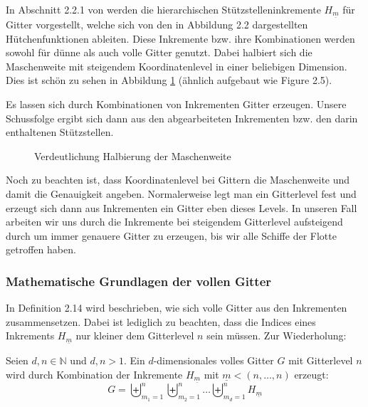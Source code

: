 \documentclass[a4paper,12pt]{llncs}
\numberwithin{equation}{section}
\begin{document}
In Abschnitt 2.2.1 von \cite{M13} werden die hierarchischen Stützstelleninkremente $H_{\underline{m}}$ für Gitter vorgestellt, welche sich von den in \cite{M13} Abbildung 2.2 dargestellten Hütchenfunktionen ableiten. Diese Inkremente bzw. ihre Kombinationen werden sowohl für dünne als auch volle Gitter genutzt. Dabei halbiert sich die Maschenweite mit steigendem Koordinatenlevel in einer beliebigen Dimension. Dies ist schön zu sehen in Abbildung \ref{fig:gitter01} (ähnlich aufgebaut wie \cite{P10} Figure 2.5).

Es lassen sich durch Kombinationen von Inkrementen Gitter erzeugen. Unsere Schussfolge ergibt sich dann aus den abgearbeiteten Inkrementen bzw. den darin enthaltenen Stützstellen. 

\begin{figure}
	\centering
	\resizebox{90mm}{!}{}
	\caption{Verdeutlichung Halbierung der Maschenweite}
	\label{fig:gitter01}
\end{figure}


Noch zu beachten ist, dass Koordinatenlevel bei Gittern die Maschenweite und damit die Genauigkeit angeben. Normalerweise legt man ein Gitterlevel fest und erzeugt sich dann aus Inkrementen ein Gitter eben dieses Levels. In unseren Fall arbeiten wir uns durch die Inkremente bei steigendem Gitterlevel aufsteigend durch um immer genauere Gitter zu erzeugen, bis wir alle Schiffe der Flotte getroffen haben.

\subsubsection{Mathematische Grundlagen der vollen Gitter}

In \cite{M13} Definition 2.14 wird beschrieben, wie sich volle Gitter aus den Inkrementen zusammensetzen. Dabei ist lediglich zu beachten, dass die Indices eines Inkrements $H_{\underline{m}}$ nur kleiner dem Gitterlevel $n$ sein müssen.  Zur Wiederholung:

\begin{definition}
	Seien $d,n\in\mathbb{N}$ und $d,n>1$. Ein $d$-dimensionales volles Gitter $G$ mit Gitterlevel $n$ wird durch Kombination der Inkremente $H_{\underline{m}}$ mit $\underline{m}<(n,\dots,n)$ erzeugt:
	\begin{equation}
		G=\biguplus_{m_1=1}^n\biguplus_{m_2=1}^n\dots \biguplus_{m_d=1}^n H_{\underline{m}}
	\end{equation}
\end{definition}
\end{document}
